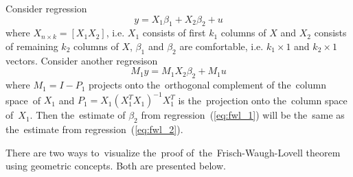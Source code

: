 \begin{theorem}
Consider regression
\begin{equation} \label{eq:fwl_1}
y = X_1 \beta_1 + X_2 \beta_2 + u
\end{equation}
where $X_{n \times k} = [X_1 X_2]$, i.e. $X_1$ consists of first $k_1$ columns of $X$ and $X_2$ consists of remaining $k_2$ columns of $X$,
$\beta_1$ and $\beta_2$ are comfortable, i.e. $k_1 \times 1$ and $k_2 \times 1$ vectors.
Consider another regresison
\begin{equation}  \label{eq:fwl_2}
M_1 y = M_1 X_2 \beta_2 + M_1 u
\end{equation}
where $M_1 = I - P_1$ projects onto the~orthogonal complement of the~column space~of
$X_1$ and $P_1 = X_1(X_1^TX_1)^{-1}X_1^T$ is the~projection onto the~column space of~$X_1$.
Then the~estimate of $\beta_2$ from regression~(\ref{eq:fwl_1}) will be the~same
as the~estimate from regression~(\ref{eq:fwl_2}).
\end{theorem}

There are two ways to~visualize the~proof of~the~Frisch-Waugh-Lovell theorem
using geometric concepts. Both are presented below.

